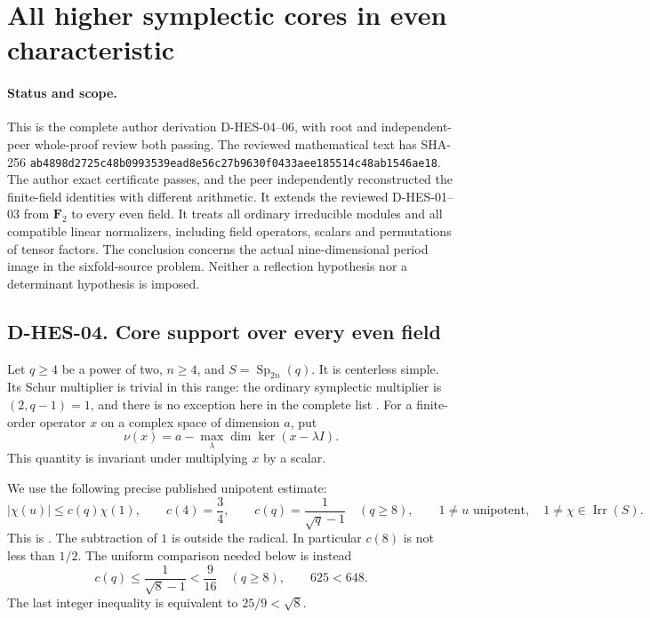 \section{All higher symplectic cores in even characteristic}
\label{sec:hes-all-even}

\paragraph{Status and scope.}
This is the complete author derivation D-HES-04--06, with root and
independent-peer whole-proof review both passing. The reviewed
mathematical text has SHA-256
\texttt{ab4898d2725c48b0993539ead8e56c27b9630f0433aee185514c48ab1546ae18}.
The author exact certificate passes, and the peer independently
reconstructed the finite-field identities with different arithmetic.
It extends the reviewed D-HES-01--03
from $\mathbf F_2$ to every even field. It treats all ordinary irreducible
modules and all compatible linear normalizers, including field operators,
scalars and permutations of tensor factors. The conclusion concerns the
actual nine-dimensional period image in the sixfold-source problem.
Neither a reflection hypothesis nor a determinant hypothesis is imposed.

\subsection*{D-HES-04. Core support over every even field}

Let $q\ge4$ be a power of two, $n\ge4$, and
$S=\operatorname{Sp}_{2n}(q)$. It is centerless simple. Its Schur multiplier
is trivial in this range: the ordinary symplectic multiplier is
$(2,q-1)=1$, and there is no exception here in the complete list
\cite[Chapter~5, Table~1, numbered p.~35]{BI:HHM}.
For a finite-order operator $x$ on a complex space of dimension $a$, put
\[
              \nu(x)=a-\max_{\lambda}\dim\ker(x-\lambda I).
\]
This quantity is invariant under multiplying $x$ by a scalar.

We use the following precise published unipotent estimate:
\[
 |\chi(u)|\le c(q)\chi(1),\qquad
 c(4)=\frac34,\qquad
 c(q)=\frac1{\sqrt q-1}\quad(q\ge8),
 \qquad 1\ne u\text{ unipotent},\quad1\ne\chi\in\operatorname{Irr}(S).
\tag{HES.12}
\]
This is \cite[Theorem~2.4(i), definitions and statement on author
pp.~2--4]{HES:Liebeck2017}. The subtraction of $1$ is outside the
radical. In particular $c(8)$ is not less than $1/2$. The uniform
comparison needed below is instead
\[
              c(q)\le\frac1{\sqrt8-1}<\frac9{16}
                  \quad(q\ge8),
       \qquad 625<648.
\tag{HES.13}
\]
The last integer inequality is equivalent to $25/9<\sqrt8$.


